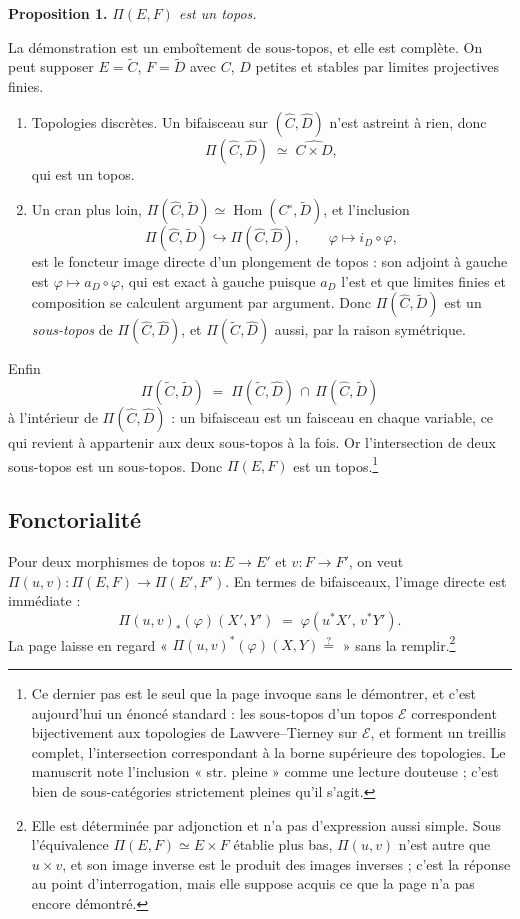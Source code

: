 \documentclass[11pt,a4paper]{article}
\begin{document}
\textbf{Proposition 1.} \emph{$\Pi(E,F)$ est un topos.}

La démonstration est un emboîtement de sous-topos, et elle est complète. On
peut supposer $E = \widetilde{C}$, $F = \widetilde{D}$ avec $C$, $D$ petites et
stables par limites projectives finies.

\begin{enumerate}
\item[a)] Topologies discrètes. Un bifaisceau sur $(\widehat{C}, \widehat{D})$
n'est astreint à rien, donc
\[
\Pi(\widehat{C}, \widehat{D}) \;\simeq\; \widehat{C \times D},
\]
qui est un topos.
\item[b)] Un cran plus loin, $\Pi(\widehat{C}, \widetilde{D}) \simeq
\operatorname{Hom}(C^{\circ}, \widetilde{D})$, et l'inclusion
\[
\Pi(\widehat{C}, \widetilde{D}) \hookrightarrow
\Pi(\widehat{C}, \widehat{D}), \qquad \varphi \longmapsto i_{D} \circ \varphi,
\]
est le foncteur image directe d'un plongement de topos : son adjoint à gauche
est $\varphi \mapsto a_{D} \circ \varphi$, qui est exact à gauche puisque
$a_{D}$ l'est et que limites finies et composition se calculent argument par
argument. Donc $\Pi(\widehat{C}, \widetilde{D})$ est un \emph{sous-topos} de
$\Pi(\widehat{C}, \widehat{D})$, et $\Pi(\widetilde{C}, \widehat{D})$ aussi,
par la raison symétrique.
\end{enumerate}

Enfin
\[
\Pi(\widetilde{C}, \widetilde{D}) \;=\; \Pi(\widetilde{C}, \widehat{D})
\,\cap\, \Pi(\widehat{C}, \widetilde{D})
\]
à l'intérieur de $\Pi(\widehat{C}, \widehat{D})$ : un bifaisceau est un
faisceau en chaque variable, ce qui revient à appartenir aux deux
sous-topos à la fois. Or l'intersection de deux sous-topos est un sous-topos.
Donc $\Pi(E,F)$ est un topos.\footnote{Ce dernier pas est le seul que la page
invoque sans le démontrer, et c'est aujourd'hui un énoncé standard :
les sous-topos d'un topos $\mathcal{E}$ correspondent bijectivement aux
topologies de Lawvere--Tierney sur $\mathcal{E}$, et forment un treillis
complet, l'intersection correspondant à la borne supérieure des topologies.
Le manuscrit note l'inclusion « str. pleine » comme une lecture douteuse ;
c'est bien de sous-catégories strictement pleines qu'il s'agit.}

\subsection*{Fonctorialité}

Pour deux morphismes de topos $u : E \to E'$ et $v : F \to F'$, on veut
$\Pi(u,v) : \Pi(E,F) \to \Pi(E',F')$. En termes de bifaisceaux, l'image directe
est immédiate :
\[
\Pi(u,v)_{*}(\varphi)(X',Y') \;=\; \varphi(u^{*}X',\, v^{*}Y').
\]
La page laisse en regard « $\Pi(u,v)^{*}(\varphi)(X,Y) \overset{?}{=}$ » sans
la remplir.\footnote{Elle est déterminée par adjonction et n'a pas d'expression
aussi simple. Sous l'équivalence $\Pi(E,F) \simeq E \times F$ établie plus bas,
$\Pi(u,v)$ n'est autre que $u \times v$, et son image inverse est le produit
des images inverses ; c'est la réponse au point d'interrogation, mais elle
suppose acquis ce que la page n'a pas encore démontré.}
\end{document}
